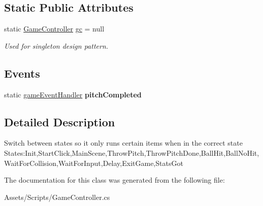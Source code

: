 \subsection*{Static Public Attributes}
\begin{DoxyCompactItemize}
\item 
static \hyperlink{class_game_controller}{Game\+Controller} \hyperlink{class_game_controller_a2c1ce3edd91a601cebe63b519af869b6}{gc} = null\hypertarget{class_game_controller_a2c1ce3edd91a601cebe63b519af869b6}{}\label{class_game_controller_a2c1ce3edd91a601cebe63b519af869b6}

\begin{DoxyCompactList}\small\item\em Used for singleton design pattern. \end{DoxyCompactList}\end{DoxyCompactItemize}
\subsection*{Events}
\begin{DoxyCompactItemize}
\item 
static \hyperlink{class_game_controller_a5729636ec46fe598b2ee7515df81b216}{game\+Event\+Handler} {\bfseries pitch\+Completed}\hypertarget{class_game_controller_a6c759ee8a1fc2ba9389eb8536313906e}{}\label{class_game_controller_a6c759ee8a1fc2ba9389eb8536313906e}

\end{DoxyCompactItemize}


\subsection{Detailed Description}
Switch between states so it only runs certain items when in the correct state States\+:Init,Start\+Click,Main\+Scene,Throw\+Pitch,Throw\+Pitch\+Done,Ball\+Hit,Ball\+No\+Hit,Wait\+For\+Collision,Wait\+For\+Input,Delay,Exit\+Game,Stats\+Got 



The documentation for this class was generated from the following file\+:\begin{DoxyCompactItemize}
\item 
Assets/\+Scripts/Game\+Controller.\+cs\end{DoxyCompactItemize}
